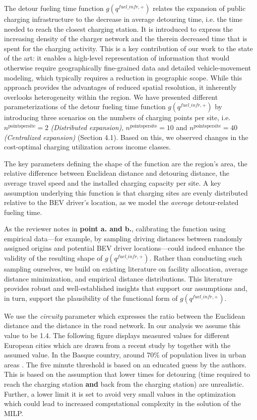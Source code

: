 \documentclass[11pt]{article}
\begin{document}
The detour fueling time function $g(q^{fuel\_infr, +})$ relates the expansion of public charging infrastructure to the decrease in average detouring time, i.e. the time needed to reach the closest charging station. It is introduced to express the increasing density of the charger network and the therein decreased time that is spent for the charging activity. This is a key contribution of our work to the state of the art: it enables a high-level representation of information that would otherwise require geographically fine-grained data and detailed vehicle-movement modeling, which typically requires a reduction in geographic scope. While this approach provides the advantages of reduced spatial resolution, it inherently overlooks heterogeneity within the region. We have presented different parameterizations of the detour fueling time function $g(q^{fuel\_infr, +})$ by introducing three scenarios on the numbers of charging points per site, i.e. $n^{\mathrm{points per site}} = 2$ \textit{(Distributed expansion)}, $n^{\mathrm{points per site}} = 10$ and $n^{\mathrm{points per site}} = 40$ \textit{(Centralized expansion)} (Section 4.1). Based on this, we observed changes in the cost-optimal charging utilization across income classes.

The key parameters defining the shape of the function are the region's area, the relative difference between Euclidean distance and detouring distance, the average travel speed and the installed charging capacity per site. A key assumption underlying this function is that charging sites are evenly distributed relative to the BEV driver’s location, as we model the \textit{average} detour-related fueling time.

As the reviewer notes in \textbf{point a. and b.}, calibrating the function using empirical data—for example, by sampling driving distances between randomly assigned origins and potential BEV driver locations—could indeed enhance the validity of the resulting shape of $g(q^{fuel\_infr, +})$. Rather than conducting such sampling ourselves, we build on existing literature on facility allocation, average distance minimization, and empirical distance distributions. This literature provides robust and well-established insights that support our assumptions and, in turn, support the plausibility of the functional form of $g(q^{fuel\_infr, +})$. 

We use the \textit{circuity} parameter which expresses the ratio between the Euclidean distance and the distance in the road network. In our analysis we assume this value to be 1.4.
The following figure displays measured values for different European cities which are drawn from a recent study by \citet{COSTA2025106087} together with the assumed value. In the Basque country, around 70\% of population lives in urban areas \citep{BasqueCountryPopulation2024}. The five minute threshold is based on an educated guess by the authors. This is based on the assumption that lower times for detouring (time required to reach the charging station \textbf{and} back from the charging station) are unrealistic. Further, a lower limit it is set to avoid very small values in the optimization which could lead to increased computational complexity in the solution of the MILP.
\end{document}
